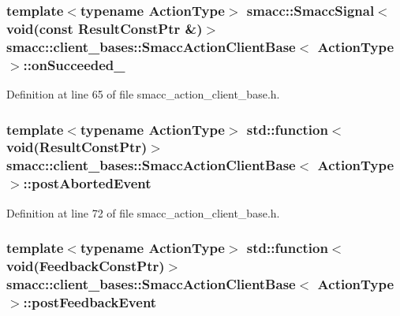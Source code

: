 \subsubsection[{\texorpdfstring{on\+Succeeded\+\_\+}{onSucceeded_}}]{\setlength{\rightskip}{0pt plus 5cm}template$<$typename Action\+Type$>$ {\bf smacc\+::\+Smacc\+Signal}$<$void(const Result\+Const\+Ptr \&)$>$ {\bf smacc\+::client\+\_\+bases\+::\+Smacc\+Action\+Client\+Base}$<$ Action\+Type $>$\+::on\+Succeeded\+\_\+}\hypertarget{classsmacc_1_1client__bases_1_1SmaccActionClientBase_afa1d615e16c9e825d815a3a3ccaa61df}{}\label{classsmacc_1_1client__bases_1_1SmaccActionClientBase_afa1d615e16c9e825d815a3a3ccaa61df}


Definition at line 65 of file smacc\+\_\+action\+\_\+client\+\_\+base.\+h.

\subsubsection[{\texorpdfstring{post\+Aborted\+Event}{postAbortedEvent}}]{\setlength{\rightskip}{0pt plus 5cm}template$<$typename Action\+Type$>$ std\+::function$<$void(Result\+Const\+Ptr)$>$ {\bf smacc\+::client\+\_\+bases\+::\+Smacc\+Action\+Client\+Base}$<$ Action\+Type $>$\+::post\+Aborted\+Event}\hypertarget{classsmacc_1_1client__bases_1_1SmaccActionClientBase_a9ca2952ededeec233ee6d8a9a39c680b}{}\label{classsmacc_1_1client__bases_1_1SmaccActionClientBase_a9ca2952ededeec233ee6d8a9a39c680b}


Definition at line 72 of file smacc\+\_\+action\+\_\+client\+\_\+base.\+h.

\subsubsection[{\texorpdfstring{post\+Feedback\+Event}{postFeedbackEvent}}]{\setlength{\rightskip}{0pt plus 5cm}template$<$typename Action\+Type$>$ std\+::function$<$void(Feedback\+Const\+Ptr)$>$ {\bf smacc\+::client\+\_\+bases\+::\+Smacc\+Action\+Client\+Base}$<$ Action\+Type $>$\+::post\+Feedback\+Event}\hypertarget{classsmacc_1_1client__bases_1_1SmaccActionClientBase_ac754fb0adfc982fe1adde0d92842a33b}{}\label{classsmacc_1_1client__bases_1_1SmaccActionClientBase_ac754fb0adfc982fe1adde0d92842a33b}


